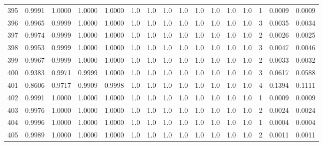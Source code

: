 \begin{tabular}{lrrrrrrrrrrrrrrr}
395 &      0.9991 &  1.0000 &  1.0000 &  1.0000 &     1.0 &     1.0 &     1.0 &     1.0 &     1.0 &     1.0 &      1.0 &        1.0 &      1 &                    0.0009 &                     0.0009 \\
396 &      0.9965 &  0.9999 &  1.0000 &  1.0000 &     1.0 &     1.0 &     1.0 &     1.0 &     1.0 &     1.0 &      1.0 &        1.0 &      3 &                    0.0035 &                     0.0034 \\
397 &      0.9974 &  0.9999 &  1.0000 &  1.0000 &     1.0 &     1.0 &     1.0 &     1.0 &     1.0 &     1.0 &      1.0 &        1.0 &      2 &                    0.0026 &                     0.0025 \\
398 &      0.9953 &  0.9999 &  1.0000 &  1.0000 &     1.0 &     1.0 &     1.0 &     1.0 &     1.0 &     1.0 &      1.0 &        1.0 &      3 &                    0.0047 &                     0.0046 \\
399 &      0.9967 &  0.9999 &  1.0000 &  1.0000 &     1.0 &     1.0 &     1.0 &     1.0 &     1.0 &     1.0 &      1.0 &        1.0 &      2 &                    0.0033 &                     0.0032 \\
400 &      0.9383 &  0.9971 &  0.9999 &  1.0000 &     1.0 &     1.0 &     1.0 &     1.0 &     1.0 &     1.0 &      1.0 &        1.0 &      3 &                    0.0617 &                     0.0588 \\
401 &      0.8606 &  0.9717 &  0.9909 &  0.9998 &     1.0 &     1.0 &     1.0 &     1.0 &     1.0 &     1.0 &      1.0 &        1.0 &      4 &                    0.1394 &                     0.1111 \\
402 &      0.9991 &  1.0000 &  1.0000 &  1.0000 &     1.0 &     1.0 &     1.0 &     1.0 &     1.0 &     1.0 &      1.0 &        1.0 &      1 &                    0.0009 &                     0.0009 \\
403 &      0.9976 &  1.0000 &  1.0000 &  1.0000 &     1.0 &     1.0 &     1.0 &     1.0 &     1.0 &     1.0 &      1.0 &        1.0 &      2 &                    0.0024 &                     0.0024 \\
404 &      0.9996 &  1.0000 &  1.0000 &  1.0000 &     1.0 &     1.0 &     1.0 &     1.0 &     1.0 &     1.0 &      1.0 &        1.0 &      1 &                    0.0004 &                     0.0004 \\
405 &      0.9989 &  1.0000 &  1.0000 &  1.0000 &     1.0 &     1.0 &     1.0 &     1.0 &     1.0 &     1.0 &      1.0 &        1.0 &      2 &                    0.0011 &                     0.0011 \\

\end{tabular}

